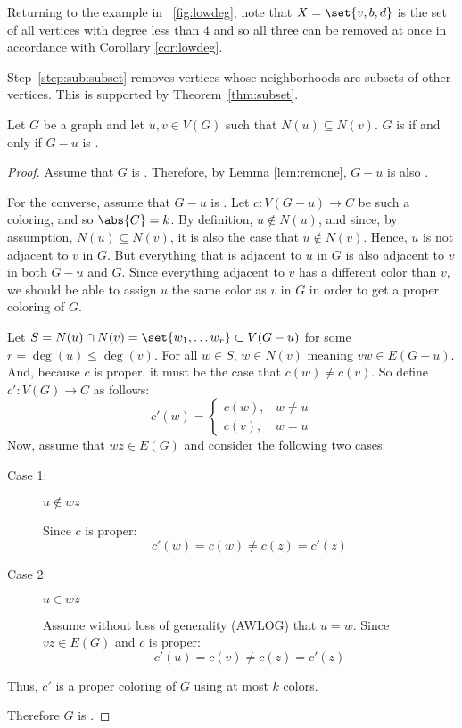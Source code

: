 Returning to the example in \figurename~\ref{fig:lowdeg}, note that \(X=\set{v,b,d}\) is the set of all vertices
with degree less than \(4\) and so all three can be removed at once in accordance with Corollary \ref{cor:lowdeg}.

Step~\ref{step:sub:subset} removes vertices whose neighborhoods are subsets of other vertices.  This is supported
by Theorem~\ref{thm:subset}.

\begin{theorem}
  \label{thm:subset}
  Let \(G\) be a graph and let \(u,v\in V(G)\) such that \(N(u)\subseteq N(v)\).  \(G\) is  if and
  only if \(G-u\) is .
\end{theorem}

\begin{proof}
  Assume that \(G\) is .  Therefore, by Lemma \ref{lem:remone}, \(G-u\) is also .

  For the converse, assume that \(G-u\) is .  Let \(c:V(G-u)\to C\) be such a coloring, and so
  \(\abs{C}=k\).  By definition, \(u\notin N(u)\), and since, by assumption, \(N(u)\subseteq N(v)\), it is also the
  case that \(u\notin N(v)\).  Hence, \(u\) is not adjacent to \(v\) in \(G\).  But everything that is adjacent to
  \(u\) in \(G\) is also adjacent to \(v\) in both \(G-u\) and \(G\).  Since everything adjacent to \(v\) has a
  different color than \(v\), we should be able to assign \(u\) the same color as \(v\) in \(G\) in order to get a
  proper coloring of \(G\).

  Let \(S=N(u)\cap N(v)=\set{w_1,\ldots w_r}\subset V(G-u)\) for some \(r=\deg(u)\le \deg(v)\).  For all \(w\in
  S\), \(w\in N(v)\) meaning \(vw\in E(G-u)\).  And, because \(c\) is proper, it must be the case that \(c(w)\ne
  c(v)\).  So define \(c':V(G)\to C\) as follows:
  \[c'(w)=\begin{cases}
  c(w), & w\ne u \\
  c(v), & w=u
  \end{cases}\]
  Now, assume that \(wz\in E(G)\) and consider the following two cases:
  \begin{description}
  \item[Case 1:] \(u\notin wz\)

    Since \(c\) is proper:
    \[c'(w)=c(w)\ne c(z)=c'(z)\]
  \item[Case 2:] \(u\in wz\)

    Assume without loss of generality (AWLOG) that \(u=w\).  Since \(vz\in E(G)\) and \(c\) is proper:
    \[c'(u)=c(v)\ne c(z)=c'(z)\]
  \end{description}
  Thus, \(c'\) is a proper coloring of \(G\) using at most \(k\) colors.

  Therefore \(G\) is .
\end{proof}

